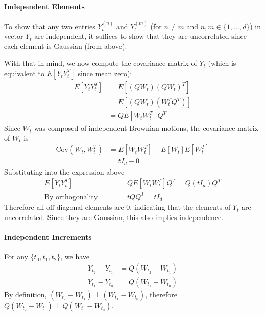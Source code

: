 \documentclass[12pt]{article}
\theoremstyle{plain}
\theoremstyle{definition}
\theoremstyle{remark}
\begin{document}
\begin{enumerate}
    \paragraph{Independent Elements} To show that any two entries
    $Y^{(n)}_t$ and $Y^{(m)}_t$ (for $n\neq m$ and
    $n,m\in\{1,\ldots,d\}$) in vector $Y_t$ are independent, it suffices
    to show that they are uncorrelated since each element is Gaussian
    (from above).

    With that in mind, we now compute the covariance matrix of $Y_t$
    (which is equivalent to $E[Y_tY^T_t]$ since mean zero):
    \begin{align*}
      E\left[Y_t Y^T_t\right]
      &= E\left[
        \left(Q W_t\right)
        \left(QW_t\right)^T
      \right] \\
      &= E\left[
        \left(Q W_t\right)
        \left(W^T_t Q^T\right)
      \right] \\
      &= QE\left[
        W_t
        W^T_t\right] Q^T
    \end{align*}
    Since $W_t$ was composed of independent Brownian motions, the
    covariance matrix of $W_t$ is
    \begin{align*}
      \text{Cov}(W_t,W^T_t)
        &= E[W_tW^T_t] - E[W_t] E[W^T_t]\\
        &= tI_d - 0
    \end{align*}
    Substituting into the expression above
    \begin{align*}
      E\left[Y_t Y^T_t\right]
      &= QE\left[
        W_t W^T_t
        \right] Q^T
      = Q
        \left(t I_d\right)
        Q^T \\
      \text{By orthogonality} \qquad
      &= t Q Q^T = t I_d
    \end{align*}
    Therefore all off-diagonal elements are 0, indicating that the
    elements of $Y_t$ are uncorrelated. Since they are Gaussian, this
    also implies independence.

    \paragraph{Independent Increments}
    For any $\{t_0,t_1,t_2\}$, we have
    \begin{align*}
      Y_{t_2} - Y_{t_1} &= Q (W_{t_2} - W_{t_1})\\
      Y_{t_1} - Y_{t_0} &= Q (W_{t_1} - W_{t_0})
    \end{align*}
    By definition, $(W_{t_2}-W_{t_1}) \perp (W_{t_1}-W_{t_0})$,
    therefore $Q(W_{t_2}-W_{t_1}) \perp Q(W_{t_1}-W_{t_0})$.


\end{enumerate}
\end{document}
